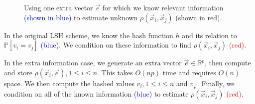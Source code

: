 \documentclass[runningheads]{llncs}
\newcommand{\vecw}{\vec{w}}
\newcommand{\vece}{\vec{e}}
\newcommand{\vecxj}{\vec{x}_j}
\newcommand{\blue}[1]{\textcolor{blue}{#1}}
\newcommand{\red}[1]{\textcolor{red}{#1}}
\newcommand{\dist}[2]{\rho(#1,#2)}
\newcommand*{\Scale}[2][4]{\scalebox{#1}{\ensuremath{#2}}}%
\begin{document}
\begin{figure}[h]
\begin{center}
\end{center}
\caption{\label{fig1}Using one extra vector $\vec{e}$ for which we know relevant information \blue{(shown in blue)} to estimate unknown $\rho(\vec{x}_i,\vec{x}_j)$ (shown in red).~\label{extra_info_pic}}
\end{figure}

In the original LSH scheme, we know the hash function $h$ and its relation to $\mathbb P[v_i = v_j]$ \blue{(blue)}. We condition on these information to find $\rho(\vec{x}_i,\vec{x}_j)$ \red{(red)}.

In the extra information case, we generate an extra vector $\vec{e} \in \mathbb{R}^p$, then compute and store $\rho(\vec{x}_i, \vec{e}), 1 \leq i \leq n$. This takes $O(np)$ time and requires $O(n)$ space. We then compute the hashed values $v_i, 1 \leq i \leq n$ and $v_{\vec{e}}$. Finally, we condition on all of the known information \blue{(blue)} to estimate $\rho(\vec{x}_i,\vec{x}_j)$ \red{(red)}.
        
\end{document}
